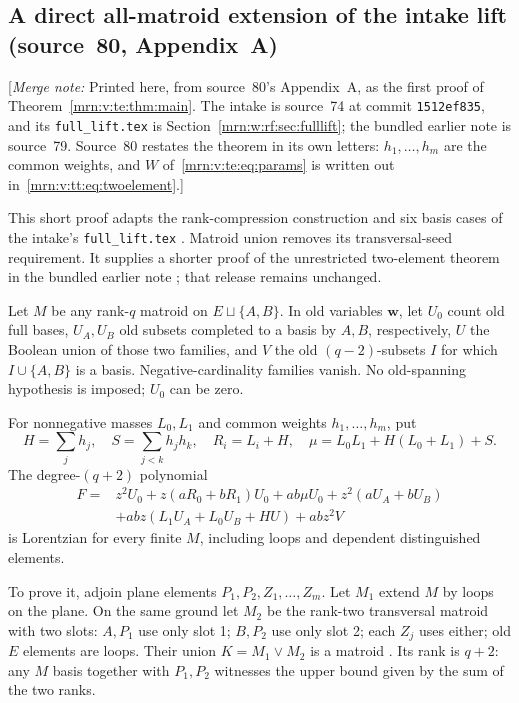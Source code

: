\documentclass[11pt,a4paper]{article}
\theoremstyle{remark}\newtheorem{remark}[theorem]{Remark}
\newcommand{\mnote}[1]{[\textit{Merge note:} #1]}
\begin{document}
\subsection{A direct all-matroid extension of the intake lift (source~80, Appendix~A)}\label{mrn:v:tt:sec:unionappendix}
\mnote{Printed here, from source~80's Appendix~A, as the first proof of
Theorem~\ref{mrn:v:te:thm:main}. The intake is source~74 at commit
\texttt{1512ef835}, and its \texttt{full\_lift.tex} is
Section~\ref{mrn:w:rf:sec:fulllift}; the bundled earlier note \cite{b:m79} is
source~79. Source~80 restates the theorem in its own letters: $h_1,\dots,h_m$
are the common weights, and $W$ of~\eqref{mrn:v:te:eq:params} is written out
in~\eqref{mrn:v:tt:eq:twoelement}.}

This short proof adapts the rank-compression construction and six basis cases of the intake's \texttt{full\_lift.tex} \cite{b:m74}. Matroid union removes its transversal-seed requirement. It supplies a shorter proof of the unrestricted two-element theorem in the bundled earlier note \cite{b:m79}; that release remains unchanged.

Let $M$ be any rank-$q$ matroid on $E\sqcup\{A,B\}$. In old variables $\mathbf w$, let $U_0$ count old full bases, $U_A,U_B$ old subsets completed to a basis by $A,B$, respectively, $U$ the Boolean union of those two families, and $V$ the old $(q-2)$-subsets $I$ for which $I\cup\{A,B\}$ is a basis. Negative-cardinality families vanish. No old-spanning hypothesis is imposed; $U_0$ can be zero.

For nonnegative masses $L_0,L_1$ and common weights $h_1,\ldots,h_m$, put
\[
 H=\sum_jh_j,\quad S=\sum_{j<k}h_jh_k,\quad
 R_i=L_i+H,\quad \mu=L_0L_1+H(L_0+L_1)+S.
\]
The degree-$(q+2)$ polynomial
\begin{align}\label{mrn:v:tt:eq:twoelement}
 F={}&z^2U_0+z(aR_0+bR_1)U_0+ab\mu U_0+z^2(aU_A+bU_B)\nonumber\\
 &+abz(L_1U_A+L_0U_B+HU)+abz^2V
\end{align}
is Lorentzian for every finite $M$, including loops and dependent distinguished elements.

To prove it, adjoin plane elements $P_1,P_2,Z_1,\ldots,Z_m$. Let $M_1$ extend $M$ by loops on the plane. On the same ground let $M_2$ be the rank-two transversal matroid with two slots: $A,P_1$ use only slot 1; $B,P_2$ use only slot 2; each $Z_j$ uses either; old $E$ elements are loops. Their union $K=M_1\vee M_2$ is a matroid \cite[Section 2]{b:BK}. Its rank is $q+2$: any $M$ basis together with $P_1,P_2$ witnesses the upper bound given by the sum of the two ranks.
\end{document}
